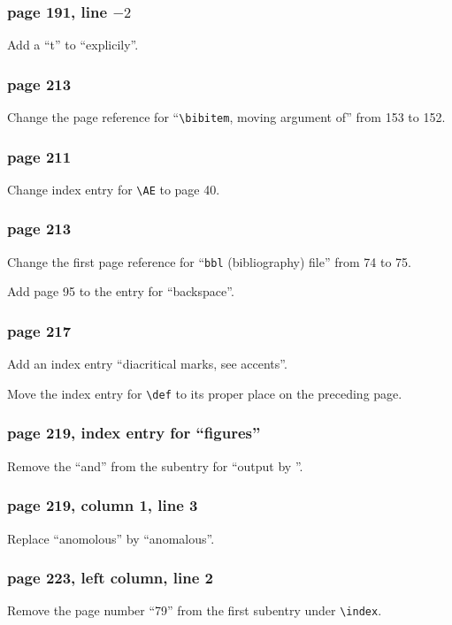 \subsubsection*{page 191, line $-2$}
Add a ``t'' to ``explicily''.

\subsubsection*{page 213}
Change the page reference for ``\verb|\bibitem|, moving argument of''
from 153 to 152.

\subsubsection*{page 211}
Change index entry for \verb|\AE| to page 40.

\subsubsection*{page 213}
Change the first page reference for ``{\tt bbl} (bibliography) file''
from 74 to 75.

Add page 95 to the entry for ``backspace''.

\subsubsection*{page 217}
Add an index entry ``diacritical marks, see accents''.

Move the index entry for \verb|\def| to its proper place on the
preceding page.

\subsubsection*{page 219, index entry for ``figures''}
Remove the ``and'' from the subentry for ``output by
\verb||''.

\subsubsection*{page 219, column 1, line 3}
Replace ``anomolous'' by ``anomalous''.

\subsubsection*{page 223, left column, line 2}
Remove the page number ``79'' from the first subentry
under \verb|\index|.

